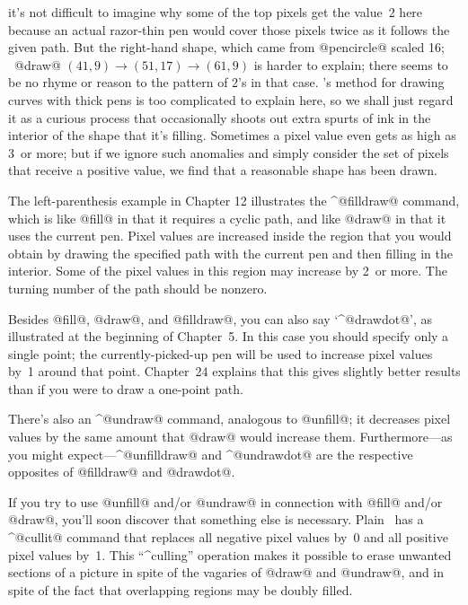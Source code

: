 {{{{\enddisplay
it's not difficult to imagine why some of the top pixels get the value~2
here because an actual razor-thin pen would cover those pixels twice as it
follows the given path. But the right-hand shape, which came from
\begindisplay
\pickup @pencircle@ scaled 16; \ @draw@ $(41,9)\to(51,17)\to(61,9)$
\enddisplay
is harder to explain; there seems to be no rhyme or reason to the pattern
of 2's in that case. \MF's method for drawing curves with thick pens is
too complicated to explain here, so we shall just regard it as a curious
process that occasionally shoots out extra spurts of ink in the interior
of the shape that it's filling. Sometimes a pixel value even gets as high
as 3~or more; but if we ignore such anomalies and simply consider the set
of pixels that receive a positive value, we find that a reasonable shape
has been drawn.

The left-parenthesis example in Chapter 12 illustrates the ^@filldraw@
command, which is like @fill@ in that it requires a cyclic path, and like
@draw@ in that it uses the current pen. Pixel values are increased inside
the region that you would obtain by drawing the specified path with the current
pen and then filling in the interior. Some of the pixel values in this
region may increase by 2~or more.  The turning number of the path
should be nonzero.

Besides @fill@, @draw@, and @filldraw@, you can also say `^@drawdot@',
as illustrated at the beginning of Chapter~5. In this case you should specify
only a single point; the currently-picked-up pen will be used to increase
pixel values by~1 around that point. Chapter~24 explains that this gives
slightly better results than if you were to draw a one-point path.

\danger There's also an ^@undraw@ command, analogous to @unfill@; it
decreases pixel values by the same amount that @draw@ would increase them.
Furthermore---as you might expect---^@unfilldraw@ and ^@undrawdot@ are the
respective opposites of @filldraw@ and @drawdot@.

\danger If you try to use @unfill@ and/or @undraw@ in connection with
@fill@ and/or @draw@, you'll soon discover that something else is
necessary. Plain \MF\ has a ^@cullit@ command that replaces all
negative pixel values by~0 and all positive pixel values by~1. This
``^{culling}'' operation makes it possible to erase unwanted sections
of a picture in spite of the vagaries of @draw@ and @undraw@, and in spite of
the fact that overlapping regions may be doubly filled.

}}}}
